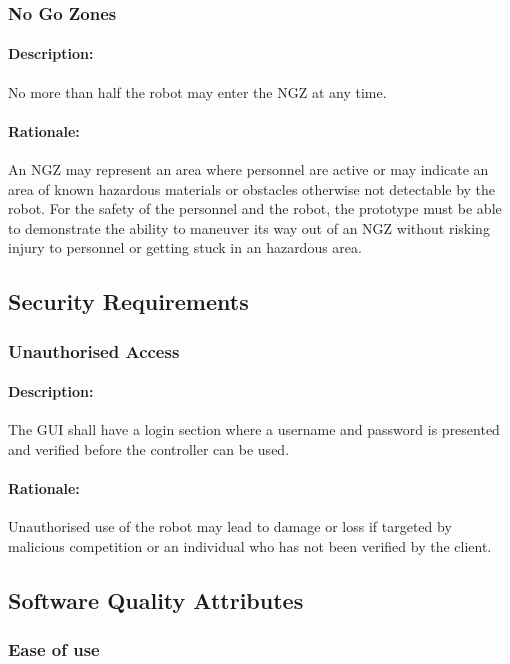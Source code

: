 \documentclass[10pt,a4paper,titlepage]{article}
\begin{document}
	\subsubsection*{No Go Zones}
	\paragraph {Description:} No more than half the robot may enter the NGZ at any time.\\
	\paragraph{Rationale:} An NGZ may represent an area where personnel are active or may indicate an area of known hazardous materials or obstacles otherwise not detectable by the robot. For the safety of the personnel and the robot, the prototype must be able to demonstrate the ability to maneuver its way out of an NGZ without risking injury to personnel or getting stuck in an hazardous area.\\
	
	\subsection{Security Requirements}
	\subsubsection*{Unauthorised Access}
	\paragraph {Description:} The GUI shall have a login section where a username and password is presented and verified before the controller can be used.\\
	\paragraph{Rationale:} Unauthorised use of the robot may lead to damage or loss if targeted by malicious competition or an individual who has not been verified by the client.\\
	
	\subsection{Software Quality Attributes}
	
	\subsubsection*{Ease of use}
\end{document}

